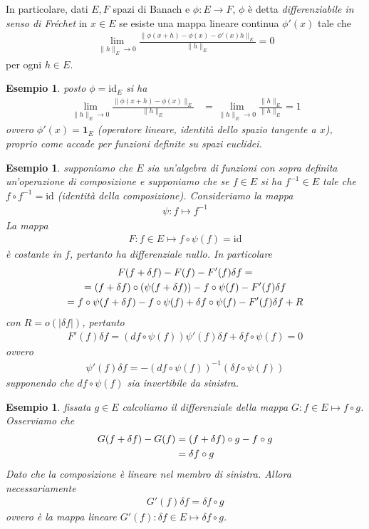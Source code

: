\documentclass[twoside, 11pt]{amsbook}
\newcommand{\0}{{(0)}}
\newcommand{\3}{{(3)}}
\theoremstyle{colonplain}
\theoremstyle{colondefinition}
\newtheorem{ex}[thm]{Esempio}
\theoremstyle{colonremark}
\numberwithin{equation}{chapter}
\begin{document}
In particolare, dati $E, F$ spazi di Banach e $\phi : E \longrightarrow F$, $\phi$ è detta \textit{differenziabile in senso di Fréchet} in $x \in E$ se esiste una mappa lineare continua $\phi'(x)$ tale che
\begin{align}
    \lim_{\|h\|_E \rightarrow 0} \frac{\|\phi(x + h) - \phi(x) - \phi'(x)h\|_E}{\|h\|_E} = 0 
\end{align}
per ogni $h \in E$.
\begin{ex} posto $\phi = \mathrm{id}_E$ si ha
\begin{align}
    \lim_{\|h\|_E \rightarrow 0}\frac{\|\phi(x + h) - \phi(x)\|_E}{\|h\|_E} &= \lim_{\|h\|_E \rightarrow 0}\frac{\|h\|_E}{\|h\|_E} = 1 
\end{align}
ovvero $\phi'(x) = \mathbf{1}_E$ (operatore lineare, identità dello spazio tangente a $x$), proprio come accade per funzioni definite su spazi euclidei.
\end{ex}
\begin{ex} supponiamo che $E$ sia un'algebra di funzioni con sopra definita un'operazione di composizione e supponiamo che se $f \in E$ si ha $f^{-1} \in E$ tale che $f \circ f^{-1} = \mathrm{id}$ (identità della composizione). Consideriamo la mappa
\begin{align}
    \psi : f \mapsto f^{-1}
\end{align}
La mappa
\begin{align}
    F : f \in E \mapsto f \circ \psi(f) = \mathrm{id}
\end{align}
è costante in $f$, pertanto ha differenziale nullo. In particolare
\begin{gather}
    F(f + \delta f) - F(f) - F'(f)\delta f = \notag \\
    = (f + \delta f) \circ (\psi(f + \delta f)) - f \circ \psi(f) - F'(f)\delta f \notag \\
    = f \circ \psi(f + \delta f) - f \circ \psi(f) + \delta f \circ \psi(f) - F'(f)\delta f + R
\end{gather}
con $R = o(|\delta f|)$, pertanto
\begin{align}
    F'(f)\delta f = (df \circ \psi(f))\psi'(f)\delta f + \delta f \circ \psi(f) = 0
\end{align}
ovvero
\begin{align}
    \psi'(f)\delta f = -(df \circ \psi(f))^{-1}(\delta f \circ \psi (f))
\end{align}
supponendo che $df \circ \psi(f)$ sia invertibile da sinistra.
\end{ex}
\begin{ex} fissata $g \in E$ calcoliamo il differenziale della mappa $G : f \in E \mapsto f \circ g$. Osserviamo che
\begin{align}
    G(f + \delta f) - G(f) &= (f + \delta f) \circ g - f \circ g \notag \\
    &= \delta f \circ g
\end{align}
Dato che la composizione è lineare nel membro di sinistra. Allora necessariamente
\begin{align}
    G'(f)\delta f = \delta f \circ g
\end{align}
ovvero è la mappa lineare $G'(f) : \delta f \in E \mapsto \delta f \circ g$.
\end{ex}
\end{document}
